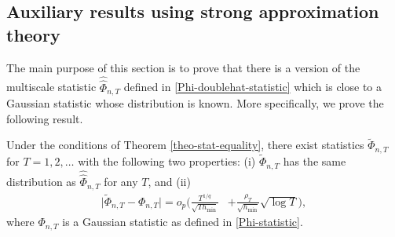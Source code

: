 \documentclass[a4paper,12pt]{article}
\newcommand{\doublehattwo}[1]{\widehat{\widehat{#1}}}
\begin{document}
\subsection*{Auxiliary results using strong approximation theory}

The main purpose of this section is to prove that there is a version of the multiscale statistic $\doublehattwo{\Phi}_{n,T}$ defined in \eqref{Phi-doublehat-statistic} which is close to a Gaussian statistic whose distribution is known. More specifically, we prove the following result. 

\begin{propA}\label{propA-strong-approx-equality}
Under the conditions of Theorem \ref{theo-stat-equality}, there exist statistics $\widetilde{\Phi}_{n,T}$ for $T = 1,2,\ldots$ with the following two properties: (i) $\widetilde{\Phi}_{n, T}$ has the same distribution as $\doublehattwo{\Phi}_{n, T}$ for any $T$, and (ii)
\begin{align*}
\big| \widetilde{\Phi}_{n, T} - \Phi_{n,T} \big| = o_p \Big( \frac{T^{1/q}}{\sqrt{T h_{\min}}} &+ \frac{\rho_T}{\sqrt{h_{\min}}}\sqrt{\log T} \Big),
\end{align*}
where $\Phi_{n,T}$ is a Gaussian statistic as defined in \eqref{Phi-statistic}. 
\end{propA}
\end{document}
